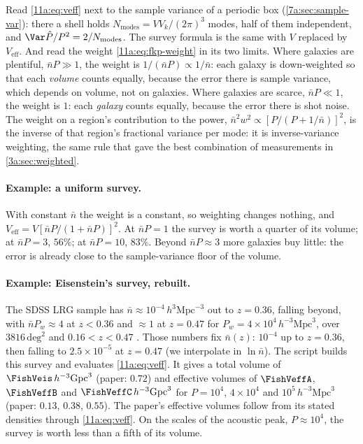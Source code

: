 Read \eqref{11a:eq:veff} next to the sample variance of a periodic box
(\cref{7a:sec:sample-var}): there a shell holds $N_{\mathrm{modes}}=VV_k/(2\pi)^3$
modes, half of them independent, and $\Var\hat P/P^2=2/N_{\mathrm{modes}}$. The
survey formula is the same with $V$ replaced by $V_{\mathrm{eff}}$. And read the
weight \eqref{11a:eq:fkp-weight} in its two limits. Where galaxies are plentiful,
$\bar nP\gg1$, the weight is $1/(\bar nP)\propto1/\bar n$: each galaxy is
down-weighted so that each \emph{volume} counts equally, because the error there is
sample variance, which depends on volume, not on galaxies. Where galaxies are
scarce, $\bar nP\ll1$, the weight is $1$: each \emph{galaxy} counts equally,
because the error there is shot noise. The weight on a region's contribution to
the power, $\bar n^2w^2\propto[P/(P+1/\bar n)]^2$, is the inverse of that region's
fractional variance per mode: it is inverse-variance weighting, the same rule
that gave the best combination of measurements in \cref{3a:sec:weighted}.

\paragraph{Example: a uniform survey.}
With constant $\bar n$ the weight is a constant, so weighting changes nothing, and
$V_{\mathrm{eff}}=V[\bar nP/(1+\bar nP)]^2$. At $\bar nP=1$ the survey is worth a
quarter of its volume; at $\bar nP=3$, $56\%$; at $\bar nP=10$, $83\%$. Beyond
$\bar nP\approx3$ more galaxies buy little: the error is already close to the
sample-variance floor of the volume.

\paragraph{Example: Eisenstein's survey, rebuilt.}
The SDSS LRG sample has $\bar n\approx10^{-4}\,h^3\mathrm{Mpc}^{-3}$ out to
$z=0.36$, falling beyond, with $\bar nP_w\approx4$ at $z<0.36$ and $\approx1$ at
$z=0.47$ for $P_w=4\times10^4\,h^{-3}\mathrm{Mpc}^3$, over $3816\,\mathrm{deg}^2$ and
$0.16<z<0.47$ . Those numbers fix
$\bar n(z)$: $10^{-4}$ up to $z=0.36$, then falling to $2.5\times10^{-5}$ at
$z=0.47$ (we interpolate in $\ln\bar n$). The script
 builds this survey and evaluates
\eqref{11a:eq:veff}. It gives a total volume of $\FishVeis\,h^{-3}\mathrm{Gpc}^3$
(paper: $0.72$) and effective volumes of $\FishVeffA$, $\FishVeffB$ and
$\FishVeffC\,h^{-3}\mathrm{Gpc}^3$ for $P=10^4$, $4\times10^4$ and $10^5\,h^{-3}
\mathrm{Mpc}^3$ (paper: $0.13$, $0.38$, $0.55$). The paper's effective volumes
follow from its stated densities through \eqref{11a:eq:veff}. On the scales of the
acoustic peak, $P\approx10^4$, the survey is worth less than a fifth of its
volume.

